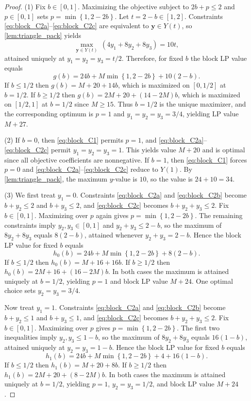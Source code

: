 \documentclass[10pt,a4paper]{amsart}
\newcommand{\set}[1]{\left\{#1\right\}}
\newcommand{\y}{\mathbf{y}}
\begin{document}
\begin{proof}
	(1) Fix $b\in[0,1]$.
	Maximizing the objective subject to $2b+p\le 2$ and $p\in[0,1]$ sets
	$p=\min\set{1,2-2b}$.
	Let $t=2-b\in[1,2]$.
	Constraints \eqref{eq:block_C2a}--\eqref{eq:block_C2c} are equivalent to $\y\in Y(t)$, so
	\cref{lem:triangle_pack} yields
	\[
		\max_{\y\in Y(t)}\ (4y_1+8y_2+8y_3)=10t,
	\]
	attained uniquely at $y_1=y_2=y_3=t/2$.
	Therefore, for fixed $b$ the block LP value equals
	\[
		g(b)=24b+M\min\set{1,2-2b}+10(2-b).
	\]
	If $b\le 1/2$ then $g(b)=M+20+14b$, which is maximized on $[0,1/2]$ at $b=1/2$.
		If $b\ge 1/2$ then $g(b)=2M+20+(14-2M)b$, which is maximized on $[1/2,1]$ at $b=1/2$ since $M\ge 15$.
	Thus $b=1/2$ is the unique maximizer, and the corresponding optimum is $p=1$ and
	$y_1=y_2=y_3=3/4$, yielding LP value $M+27$.

	\smallskip
	(2) If $b=0$, then \eqref{eq:block_C1} permits $p=1$, and \eqref{eq:block_C2a}--\eqref{eq:block_C2c}
	permit $y_1=y_2=y_3=1$. This yields value $M+20$ and is optimal since all objective coefficients are
	nonnegative.
	If $b=1$, then \eqref{eq:block_C1} forces $p=0$ and \eqref{eq:block_C2a}--\eqref{eq:block_C2c} reduce
	to $Y(1)$. By \cref{lem:triangle_pack}, the maximum $y$-value is $10$, so the value is $24+10=34$.

	\smallskip
	(3) We first treat $y_1=0$.
	Constraints \eqref{eq:block_C2a} and \eqref{eq:block_C2b} become $b+y_2\le 2$ and $b+y_3\le 2$, and
	\eqref{eq:block_C2c} becomes $b+y_2+y_3\le 2$.
	Fix $b\in[0,1]$.
	Maximizing over $p$ again gives $p=\min\set{1,2-2b}$.
	The remaining constraints imply $y_2,y_3\in[0,1]$ and $y_2+y_3\le 2-b$, so the maximum of
	$8y_2+8y_3$ equals $8(2-b)$, attained whenever $y_2+y_3=2-b$.
	Hence the block LP value for fixed $b$ equals
	\[
		h_0(b)=24b+M\min\set{1,2-2b}+8(2-b).
	\]
	If $b\le 1/2$ then $h_0(b)=M+16+16b$.
	If $b\ge 1/2$ then $h_0(b)=2M+16+(16-2M)b$.
	In both cases the maximum is attained uniquely at $b=1/2$, yielding $p=1$ and block LP value $M+24$.
	One optimal choice sets $y_2=y_3=3/4$.

	Now treat $y_1=1$.
	Constraints \eqref{eq:block_C2a} and \eqref{eq:block_C2b} become $b+y_2\le 1$ and $b+y_3\le 1$, and
	\eqref{eq:block_C2c} becomes $b+y_2+y_3\le 2$.
	Fix $b\in[0,1]$.
	Maximizing over $p$ gives $p=\min\set{1,2-2b}$.
	The first two inequalities imply $y_2,y_3\le 1-b$, so the maximum of $8y_2+8y_3$ equals $16(1-b)$,
	attained uniquely at $y_2=y_3=1-b$.
	Hence the block LP value for fixed $b$ equals
	\[
		h_1(b)=24b+M\min\set{1,2-2b}+4+16(1-b).
	\]
	If $b\le 1/2$ then $h_1(b)=M+20+8b$.
	If $b\ge 1/2$ then $h_1(b)=2M+20+(8-2M)b$.
	In both cases the maximum is attained uniquely at $b=1/2$, yielding $p=1$, $y_2=y_3=1/2$, and block LP value $M+24$.


\end{proof}
\end{document}

